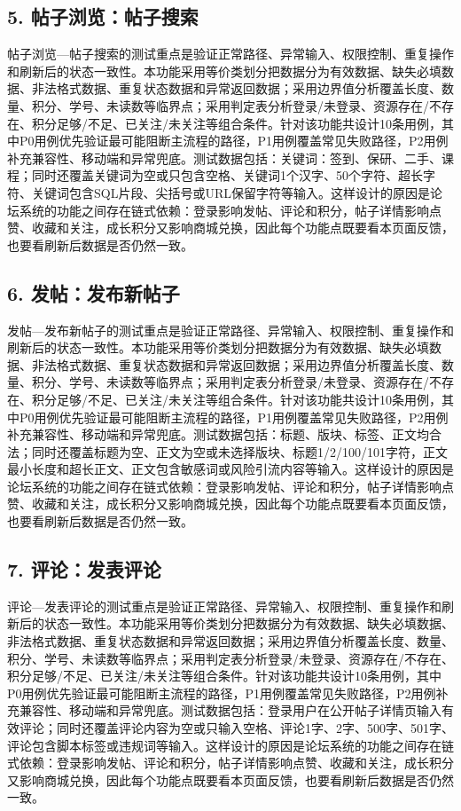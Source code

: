 \documentclass[UTF8,zihao=-4]{ctexart}
\begin{document}
\subsection{5. 帖子浏览：帖子搜索}
帖子浏览—帖子搜索的测试重点是验证正常路径、异常输入、权限控制、重复操作和刷新后的状态一致性。本功能采用等价类划分把数据分为有效数据、缺失必填数据、非法格式数据、重复状态数据和异常返回数据；采用边界值分析覆盖长度、数量、积分、学号、未读数等临界点；采用判定表分析登录/未登录、资源存在/不存在、积分足够/不足、已关注/未关注等组合条件。针对该功能共设计10条用例，其中P0用例优先验证最可能阻断主流程的路径，P1用例覆盖常见失败路径，P2用例补充兼容性、移动端和异常兜底。测试数据包括：关键词：签到、保研、二手、课程；同时还覆盖关键词为空或只包含空格、关键词1个汉字、50个字符、超长字符、关键词包含SQL片段、尖括号或URL保留字符等输入。这样设计的原因是论坛系统的功能之间存在链式依赖：登录影响发帖、评论和积分，帖子详情影响点赞、收藏和关注，成长积分又影响商城兑换，因此每个功能点既要看本页面反馈，也要看刷新后数据是否仍然一致。

\subsection{6. 发帖：发布新帖子}
发帖—发布新帖子的测试重点是验证正常路径、异常输入、权限控制、重复操作和刷新后的状态一致性。本功能采用等价类划分把数据分为有效数据、缺失必填数据、非法格式数据、重复状态数据和异常返回数据；采用边界值分析覆盖长度、数量、积分、学号、未读数等临界点；采用判定表分析登录/未登录、资源存在/不存在、积分足够/不足、已关注/未关注等组合条件。针对该功能共设计10条用例，其中P0用例优先验证最可能阻断主流程的路径，P1用例覆盖常见失败路径，P2用例补充兼容性、移动端和异常兜底。测试数据包括：标题、版块、标签、正文均合法；同时还覆盖标题为空、正文为空或未选择版块、标题1/2/100/101字符，正文最小长度和超长正文、正文包含敏感词或风险引流内容等输入。这样设计的原因是论坛系统的功能之间存在链式依赖：登录影响发帖、评论和积分，帖子详情影响点赞、收藏和关注，成长积分又影响商城兑换，因此每个功能点既要看本页面反馈，也要看刷新后数据是否仍然一致。

\subsection{7. 评论：发表评论}
评论—发表评论的测试重点是验证正常路径、异常输入、权限控制、重复操作和刷新后的状态一致性。本功能采用等价类划分把数据分为有效数据、缺失必填数据、非法格式数据、重复状态数据和异常返回数据；采用边界值分析覆盖长度、数量、积分、学号、未读数等临界点；采用判定表分析登录/未登录、资源存在/不存在、积分足够/不足、已关注/未关注等组合条件。针对该功能共设计10条用例，其中P0用例优先验证最可能阻断主流程的路径，P1用例覆盖常见失败路径，P2用例补充兼容性、移动端和异常兜底。测试数据包括：登录用户在公开帖子详情页输入有效评论；同时还覆盖评论内容为空或只输入空格、评论1字、2字、500字、501字、评论包含脚本标签或违规词等输入。这样设计的原因是论坛系统的功能之间存在链式依赖：登录影响发帖、评论和积分，帖子详情影响点赞、收藏和关注，成长积分又影响商城兑换，因此每个功能点既要看本页面反馈，也要看刷新后数据是否仍然一致。
\end{document}
